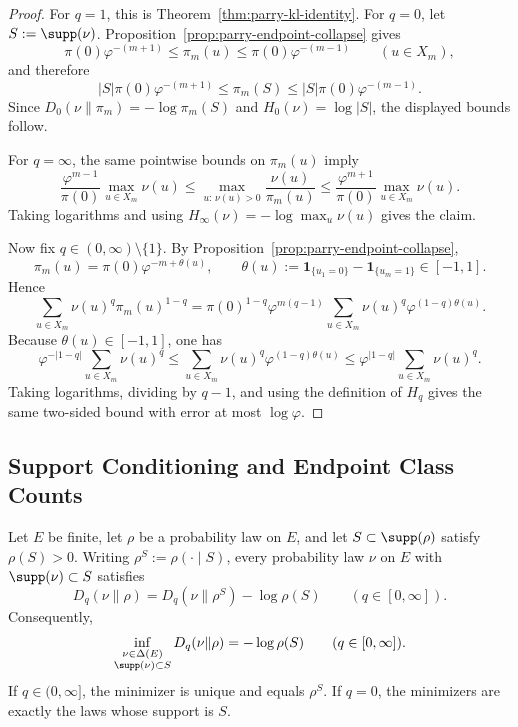 \begin{proof}
For \(q=1\), this is Theorem~\ref{thm:parry-kl-identity}. For \(q=0\), let
\(S:=\supp(\nu)\). Proposition~\ref{prop:parry-endpoint-collapse} gives
\[
\pi(0)\varphi^{-(m+1)}
\le
\pi_m(u)
\le
\pi(0)\varphi^{-(m-1)}
\qquad (u\in X_m),
\]
and therefore
\[
|S|\pi(0)\varphi^{-(m+1)}
\le
\pi_m(S)
\le
|S|\pi(0)\varphi^{-(m-1)}.
\]
Since \(D_0(\nu\|\pi_m)=-\log \pi_m(S)\) and \(H_0(\nu)=\log|S|\), the
displayed bounds follow.

For \(q=\infty\), the same pointwise bounds on \(\pi_m(u)\) imply
\[
\frac{\varphi^{m-1}}{\pi(0)}\max_{u\in X_m}\nu(u)
\le
\max_{u:\,\nu(u)>0}\frac{\nu(u)}{\pi_m(u)}
\le
\frac{\varphi^{m+1}}{\pi(0)}\max_{u\in X_m}\nu(u).
\]
Taking logarithms and using \(H_\infty(\nu)=-\log\max_u \nu(u)\) gives the
claim.

Now fix \(q\in(0,\infty)\setminus\{1\}\). By
Proposition~\ref{prop:parry-endpoint-collapse},
\[
\pi_m(u)
=
\pi(0)\varphi^{-m+\theta(u)},
\qquad
\theta(u):=\mathbf{1}_{\{u_1=0\}}-\mathbf{1}_{\{u_m=1\}}\in[-1,1].
\]
Hence
\[
\sum_{u\in X_m}\nu(u)^q\pi_m(u)^{1-q}
=
\pi(0)^{1-q}\varphi^{m(q-1)}
\sum_{u\in X_m}\nu(u)^q\varphi^{(1-q)\theta(u)}.
\]
Because \(\theta(u)\in[-1,1]\), one has
\[
\varphi^{-|1-q|}\sum_{u\in X_m}\nu(u)^q
\le
\sum_{u\in X_m}\nu(u)^q\varphi^{(1-q)\theta(u)}
\le
\varphi^{|1-q|}\sum_{u\in X_m}\nu(u)^q.
\]
Taking logarithms, dividing by \(q-1\), and using the definition of \(H_q\)
gives the same two-sided bound with error at most \(\log\varphi\).
\end{proof}

\subsection{Support Conditioning and Endpoint Class Counts}

\begin{proposition}
\label{prop:renyi-support-conditioning}
Let \(E\) be finite, let \(\rho\) be a probability law on \(E\), and let
\(S\subset \supp(\rho)\) satisfy \(\rho(S)>0\). Writing
\(\rho^S:=\rho(\cdot\mid S)\), every probability law \(\nu\) on \(E\) with
\(\supp(\nu)\subset S\) satisfies
\[
D_q(\nu\|\rho)
=
D_q(\nu\|\rho^S)-\log \rho(S)
\qquad (q\in[0,\infty]).
\]
Consequently,
\[
\inf_{\substack{\nu\in\Delta(E)\\ \supp(\nu)\subset S}} D_q(\nu\|\rho)
=
-\log \rho(S)
\qquad (q\in[0,\infty]).
\]
If \(q\in(0,\infty]\), the minimizer is unique and equals \(\rho^S\). If
\(q=0\), the minimizers are exactly the laws whose support is \(S\).
\end{proposition}

